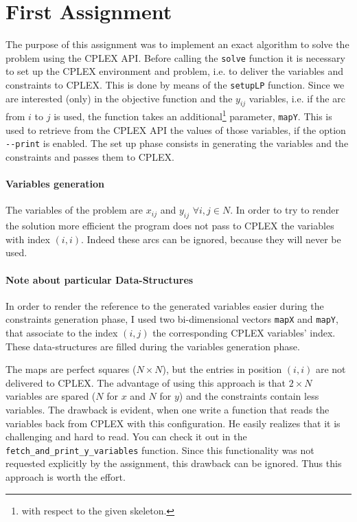 \section{First Assignment}
\label{sec:problemI}
The purpose of this assignment was to implement an exact algorithm to solve the problem using the CPLEX API.
Before calling the \verb|solve| function
it is necessary to set up the CPLEX environment and problem, i.e. to deliver the variables and constraints to CPLEX. This is done by means of the \verb|setupLP| function.
Since we are interested (only) in the objective function and the $y_{ij}$ variables, i.e. if the arc from $i$
to $j$ is used, the function takes
an additional\footnote{with respect to the given skeleton.} parameter,  \verb|mapY|. This is used to
retrieve from the CPLEX API the values of those variables, if the option  \verb|--print| is enabled.
The set up phase consists in generating the variables and the constraints and passes them to CPLEX.

\paragraph{Variables generation}
The variables of the problem are $x_{ij}$ and $y_{ij}$ $\forall i,j \in N$.
In order to try to render the solution more efficient the program does not pass
to CPLEX the variables with index $(i,i)$. Indeed these arcs can be ignored, because
they will never be used.



\paragraph{Note about particular Data-Structures} In order to render the reference to the generated variables easier
during the constraints generation phase, I used two bi-dimensional vectors \verb|mapX| and \verb|mapY|, that 
associate to the index $(i,j)$ the corresponding CPLEX variables' index.
These data-structures are filled during the variables generation phase.

The maps are perfect squares ($N\times N$), but the entries in position $(i,i)$ are not delivered to CPLEX.
The advantage of using this approach is that $2\times N$ variables are spared ($N$ for $x$ and $N$ for $y$) and the constraints
contain less variables.
The drawback is evident, when one write a function that reads the variables back from CPLEX with this configuration. He easily realizes
that it is challenging and hard to read.
You can check it out in the \verb|fetch_and_print_y_variables| function.
Since this functionality was not requested explicitly by the assignment,
this drawback can be ignored. Thus this approach is worth the effort.



